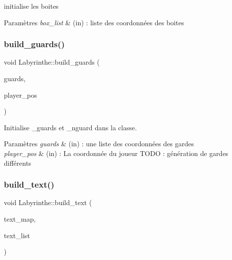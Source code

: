 initialise les boites 


\begin{DoxyParams}{Paramètres}
{\em box\+\_\+list} & (in) \+: liste des coordonnées des boites \\
\hline
\end{DoxyParams}
\mbox{\label{classLabyrinthe_a3fc2a0b2bbf0d1101fd7a3804bda9584}} 
\subsubsection{\texorpdfstring{build\+\_\+guards()}{build\_guards()}}
{\footnotesize\ttfamily void Labyrinthe\+::build\+\_\+guards (\begin{DoxyParamCaption}\item[{list$<$ \hyperlink{structcoord}{coord} $>$}]{guards,  }\item[{const \hyperlink{structcoord}{coord} \&}]{player\+\_\+pos }\end{DoxyParamCaption})\hspace{0.3cm}{\ttfamily [private]}}



Initialise \+\_\+guards et \+\_\+nguard dans la classe. 


\begin{DoxyParams}{Paramètres}
{\em guards} & (in) \+: une liste des coordonnées des gardes \\
\hline
{\em player\+\_\+pos} & (in) \+: La coordonnée du joueur T\+O\+DO \+: génération de gardes différents \\
\hline
\end{DoxyParams}
\mbox{\label{classLabyrinthe_a719b7fe3a3e8f6be8299aab9cc1cf338}} 
\subsubsection{\texorpdfstring{build\+\_\+text()}{build\_text()}}
{\footnotesize\ttfamily void Labyrinthe\+::build\+\_\+text (\begin{DoxyParamCaption}\item[{map$<$ char, string $>$}]{text\+\_\+map,  }\item[{list$<$ tuple$<$ \hyperlink{structcoord}{coord}, char, bool $>$$>$}]{text\+\_\+list }\end{DoxyParamCaption})\hspace{0.3cm}{\ttfamily [private]}}



